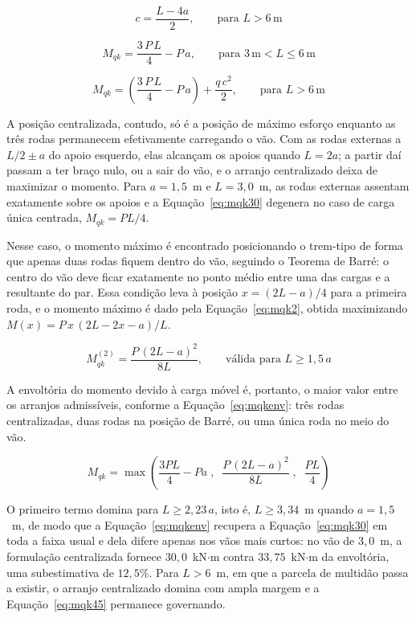\begin{equation}
c = \frac{L - 4a}{2}, \qquad \text{para } L > 6\,\text{m}
\label{eq:cmomento}
\end{equation}

\begin{equation}
M_{qk} = \frac{3\,P\,L}{4} - P\,a, \qquad \text{para } 3\,\text{m} < L \leq 6\,\text{m}
\label{eq:mqk30}
\end{equation}

\begin{equation}
M_{qk} = \left(\frac{3\,P\,L}{4} - P\,a\right) + \frac{q\,c^2}{2}, \qquad \text{para } L > 6\,\text{m}
\label{eq:mqk45}
\end{equation}

A posição centralizada, contudo, só é a posição de máximo esforço enquanto as três rodas permanecem efetivamente carregando o vão. Com as rodas externas a $L/2 \pm a$ do apoio esquerdo, elas alcançam os apoios quando $L = 2a$; a partir daí passam a ter braço nulo, ou a sair do vão, e o arranjo centralizado deixa de maximizar o momento. Para $a = 1{,}5$~m e $L = 3{,}0$~m, as rodas externas assentam exatamente sobre os apoios e a Equação~\eqref{eq:mqk30} degenera no caso de carga única centrada, $M_{qk} = PL/4$.

Nesse caso, o momento máximo é encontrado posicionando o trem-tipo de forma que apenas duas rodas fiquem dentro do vão, seguindo o Teorema de Barré: o centro do vão deve ficar exatamente no ponto médio entre uma das cargas e a resultante do par. Essa condição leva à posição $x = (2L-a)/4$ para a primeira roda, e o momento máximo é dado pela Equação~\eqref{eq:mqk2}, obtida maximizando $M(x) = P\,x\,(2L - 2x - a)/L$.

\begin{equation}
M_{qk}^{(2)} = \frac{P\,(2L-a)^2}{8L}, \qquad \text{válida para } L \geq 1{,}5\,a
\label{eq:mqk2}
\end{equation}

A envoltória do momento devido à carga móvel é, portanto, o maior valor entre os arranjos admissíveis, conforme a Equação~\eqref{eq:mqkenv}: três rodas centralizadas, duas rodas na posição de Barré, ou uma única roda no meio do vão.

\begin{equation}
M_{qk} = \max\left(\frac{3PL}{4} - Pa\;,\;\; \frac{P\,(2L-a)^2}{8L}\;,\;\; \frac{PL}{4}\right)
\label{eq:mqkenv}
\end{equation}

O primeiro termo domina para $L \geq 2{,}23\,a$, isto é, $L \geq 3{,}34$~m quando $a = 1{,}5$~m, de modo que a Equação~\eqref{eq:mqkenv} recupera a Equação~\eqref{eq:mqk30} em toda a faixa usual e dela difere apenas nos vãos mais curtos: no vão de $3{,}0$~m, a formulação centralizada fornece $30{,}0$~kN$\cdot$m contra $33{,}75$~kN$\cdot$m da envoltória, uma subestimativa de $12{,}5\%$. Para $L > 6$~m, em que a parcela de multidão passa a existir, o arranjo centralizado domina com ampla margem e a Equação~\eqref{eq:mqk45} permanece governando.

